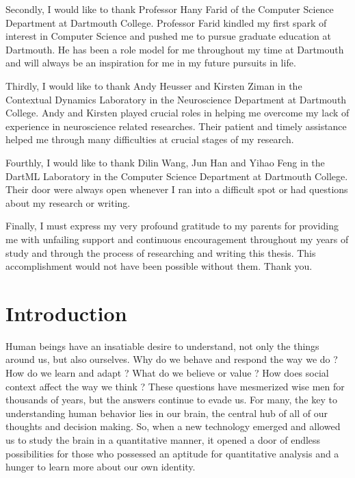 \documentclass[11pt]{article}
\begin{document}
Secondly, I would like to thank Professor Hany Farid of the Computer Science Department at Dartmouth College. Professor Farid kindled my first spark of interest in Computer Science and pushed me to pursue graduate education at Dartmouth. He has been a role model for me throughout my time at Dartmouth and will always be an inspiration for me in my future pursuits in life.

Thirdly, I would like to thank Andy Heusser and Kirsten Ziman in the Contextual Dynamics Laboratory in the Neuroscience Department at Dartmouth College. Andy and Kirsten played crucial roles in helping me overcome my lack of experience in neuroscience related researches. Their patient and timely assistance helped me through many difficulties at crucial stages of my research.

Fourthly, I would like to thank Dilin Wang, Jun Han and Yihao Feng in the DartML Laboratory in the Computer Science Department at Dartmouth College. Their door were always open whenever I ran into a difficult spot or had questions about my research or writing.

Finally, I must express my very profound gratitude to my parents for providing me with unfailing support and continuous encouragement throughout my years of study and through the process of researching and writing this thesis. This accomplishment would not have been possible without them. Thank you.

\newpage
\tableofcontents
\newpage
{}

\section{Introduction}
Human beings have an insatiable desire to understand, not only the things around us, but also ourselves. Why do we behave and respond the way we do \citep{hasson2012}? How do we learn and adapt \citep{hasson2004}\citep{hasson2005}? What do we believe or value \citep{Greene01}? How does social context affect the way we think \citep{Matthew2015}? These questions have mesmerized wise men for thousands of years, but the answers continue to evade us. For many, the key to understanding human behavior lies in our brain, the central hub of all of our thoughts and decision making. So, when a new technology emerged and allowed us to study the brain in a quantitative manner, it opened a door of endless possibilities for those who possessed an aptitude for quantitative analysis and a hunger to learn more about our own identity.
\end{document}

